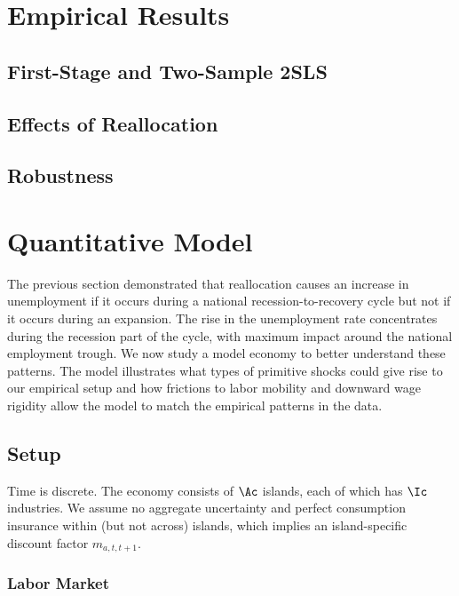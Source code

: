 \documentclass[12pt]{article}
\theoremstyle{definition}
\begin{document}
\section{Empirical Results}

\subsection{First-Stage and Two-Sample 2SLS}

\subsection{Effects of Reallocation}

\subsection{Robustness}

\section{Quantitative Model}

The previous section demonstrated that reallocation causes an increase in unemployment if it occurs during a national recession-to-recovery cycle but not if it occurs during an expansion. The rise in the unemployment rate concentrates during the recession part of the cycle, with maximum impact around the national employment trough. We now study a model economy to better understand these patterns. The model illustrates what types of primitive shocks could give rise to our empirical setup and how frictions to labor mobility and downward wage rigidity allow the model to match the empirical patterns in the data.

\subsection{Setup}

Time is discrete. The economy consists of $\Ac$ islands, each of which has $\Ic$ industries. We assume no aggregate uncertainty and perfect consumption insurance within (but not across) islands, which implies an island-specific discount factor $m_{a, t, t+1}$.

\subsubsection{Labor Market}
\end{document}
